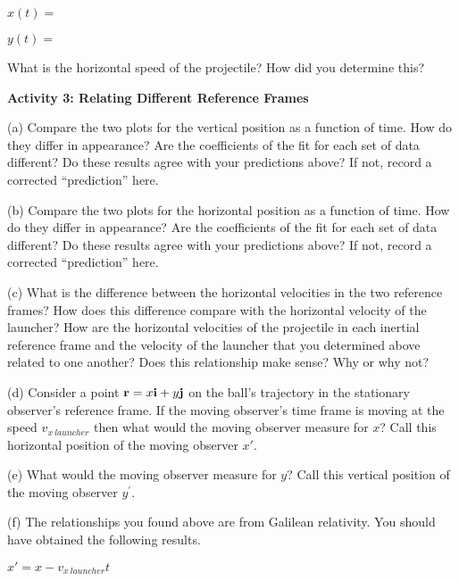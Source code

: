 $x(t) =$
\vspace{5mm}

$y(t) =$
\vspace{5mm}

What is the horizontal speed of the projectile? How did you determine
this?
\vspace{60mm}

\textbf{Activity 3: Relating Different Reference Frames}

(a) Compare the two plots for the vertical position as a function
of time. How do they differ in appearance? Are the coefficients of
the fit for each set of data different? Do these results agree with
your predictions above? If not, record a corrected {}``prediction''
here.
\vspace{20mm}

(b) Compare the two plots for the horizontal position as a function
of time. How do they differ in appearance? Are the coefficients of
the fit for each set of data different? Do these results agree with
your predictions above? If not, record a corrected {}``prediction''
here.
\vspace{17mm}

(c) What is the difference between the horizontal velocities in the
two reference frames? How does this difference compare with the horizontal
velocity of the launcher? How are the horizontal velocities of the
projectile in each inertial reference frame and the velocity of the
launcher that you determined above related to one another? Does this
relationship make sense? Why or why not?
\vspace{15mm}

(d) Consider a point ${\bf r} = x{\bf i} + y{\bf j}$ on the
ball's trajectory in the stationary observer's reference frame. If
the moving observer's time frame is moving at the speed \( v_{x\ launcher} \)
then what would the moving observer measure for $x$? Call this horizontal
position of the moving observer $x'$.
\vspace{15mm}

(e) What would the moving observer measure for $y$? Call this vertical
position of the moving observer \(y^\prime\).
\vspace{15mm}

(f) The relationships you found above are from Galilean relativity. You
should have obtained the following results.

{\centering \( x'=x-v_{x\ launcher}t \)\par}

